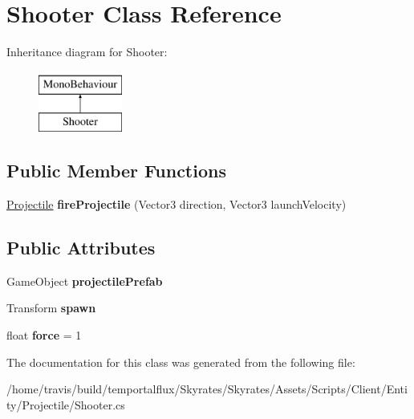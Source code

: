 \hypertarget{class_shooter}{\section{Shooter Class Reference}
\label{class_shooter}
}
Inheritance diagram for Shooter\-:\begin{figure}[H]
\begin{center}
\leavevmode
\includegraphics[height=2.000000cm]{class_shooter}
\end{center}
\end{figure}
\subsection*{Public Member Functions}
\begin{DoxyCompactItemize}
\item 
\hypertarget{class_shooter_a914df8db63db1fa2c0a43f4d182f741c}{\hyperlink{class_projectile}{Projectile} {\bfseries fire\-Projectile} (Vector3 direction, Vector3 launch\-Velocity)}\label{class_shooter_a914df8db63db1fa2c0a43f4d182f741c}

\end{DoxyCompactItemize}
\subsection*{Public Attributes}
\begin{DoxyCompactItemize}
\item 
\hypertarget{class_shooter_a9684b85835fa2311e9d3bdf31778b5d5}{Game\-Object {\bfseries projectile\-Prefab}}\label{class_shooter_a9684b85835fa2311e9d3bdf31778b5d5}

\item 
\hypertarget{class_shooter_a2ace09fc935b67cad5592a578516ec03}{Transform {\bfseries spawn}}\label{class_shooter_a2ace09fc935b67cad5592a578516ec03}

\item 
\hypertarget{class_shooter_ade2928b5b4ff8b037913d71f312cbc38}{float {\bfseries force} = 1}\label{class_shooter_ade2928b5b4ff8b037913d71f312cbc38}

\end{DoxyCompactItemize}


The documentation for this class was generated from the following file\-:\begin{DoxyCompactItemize}
\item 
/home/travis/build/temportalflux/\-Skyrates/\-Skyrates/\-Assets/\-Scripts/\-Client/\-Entity/\-Projectile/Shooter.\-cs\end{DoxyCompactItemize}
